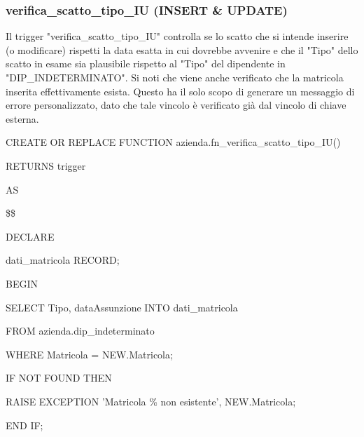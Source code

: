 \newpage

        \subsubsection{verifica\_scatto\_tipo\_IU (INSERT \& UPDATE)}
        Il trigger "verifica\_scatto\_tipo\_IU" controlla se lo scatto che si intende inserire (o modificare) rispetti la data esatta in cui dovrebbe avvenire e che il "Tipo" dello scatto in esame sia plausibile rispetto al "Tipo" del dipendente in "DIP\_INDETERMINATO". Si noti che viene anche verificato che la matricola inserita effettivamente esista. Questo ha il solo scopo di generare un messaggio di errore personalizzato, dato che tale vincolo è verificato già dal vincolo di chiave esterna.
        \ttfamily
            \begin{flushleft}
                \begin{description}
                    \item CREATE OR REPLACE FUNCTION azienda.fn\_verifica\_scatto\_tipo\_IU()  
                    \item RETURNS trigger
                    \item AS
                    \item \$\$
                    \item DECLARE
                    \begin{description}
                        \item dati\_matricola RECORD;
                    \end{description}
                    \item BEGIN 
                    \begin{description}
                        \item SELECT Tipo, dataAssunzione INTO dati\_matricola
                        \item FROM azienda.dip\_indeterminato
                        \item WHERE Matricola = NEW.Matricola;
                        \vspace{0.5cm}
                        \item IF NOT FOUND THEN
                        \begin{description}
                            \item RAISE EXCEPTION 'Matricola \% non esistente', NEW.Matricola;
                        \end{description}
                        \item END IF;


\end{description}
\end{description}
\end{flushleft}
